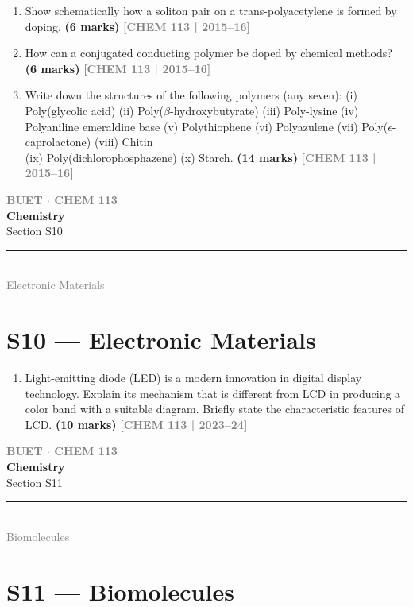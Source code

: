 \documentclass[12pt,a3paper]{article}
\newcommand{\yr}[1]{\hfill\textcolor{gray}{\small\textbf{[#1]}}}
\newcommand{\mk}[1]{\textcolor{orange!70!black}{\small\textbf{(#1 marks)}}}
\newcommand{\secdivider}[4]{%
  \newpage\thispagestyle{empty}%
  \vspace*{\fill}%
  \begin{tcolorbox}[enhanced,colback=#4!7,colframe=#3,boxrule=1.5pt,arc=8pt,
    left=20pt,right=20pt,top=22pt,bottom=22pt,
    shadow={3pt}{-3pt}{0pt}{black!15}]
    \centering
    {\large\textcolor{gray}{\textbf{BUET $\cdot$ CHEM 113}}}\\[8pt]
    {\fontsize{26}{32}\selectfont\bfseries\textcolor{#3}{Chemistry}}\\[6pt]
    {\fontsize{15}{19}\selectfont\textcolor{dgray}{#1}}\\[12pt]
    \textcolor{#3!60}{\rule{0.5\textwidth}{0.5pt}}\\[6pt]
    {\small\textcolor{gray}{#2}}
  \end{tcolorbox}%
  \vspace*{\fill}\newpage%
}
\begin{document}
\begin{enumerate}
\item Show schematically how a soliton pair on a trans-polyacetylene is formed by doping. \mk{6}
\yr{CHEM 113 | 2015--16}



\item How can a conjugated conducting polymer be doped by chemical methods? \mk{6}
\yr{CHEM 113 | 2015--16}



\item Write down the structures of the following polymers (any seven): (i) Poly(glycolic acid) (ii) Poly($\beta$-hydroxybutyrate) (iii) Poly-lysine (iv) Polyaniline emeraldine base (v) Polythiophene (vi) Polyazulene (vii) Poly($\epsilon$-caprolactone) (viii) Chitin \\(ix) Poly(dichlorophosphazene) (x) Starch. \mk{14}
\yr{CHEM 113 | 2015--16}


\end{enumerate}
\newpage

\secdivider{Section S10}{Electronic Materials}{cC}{cC}
\label{sec:S10}
\section{S10 --- Electronic Materials}

\begin{enumerate}
\item Light-emitting diode (LED) is a modern innovation in digital display technology. Explain its mechanism that is different from LCD in producing a color band with a suitable diagram. Briefly state the characteristic features of LCD. \mk{10}
\yr{CHEM 113 | 2023--24}



\end{enumerate}
\newpage


\secdivider{Section S11}{Biomolecules}{cD}{cD}
\label{sec:S11}
\section{S11 --- Biomolecules}
\end{document}
